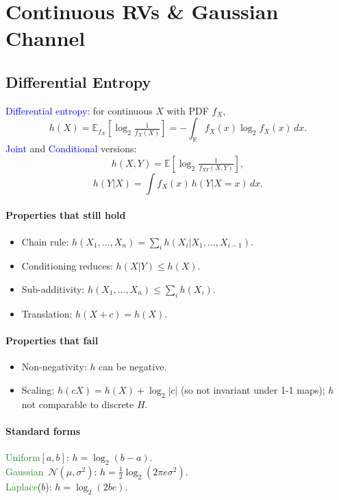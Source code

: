 \section{Continuous RVs \& Gaussian Channel}
\subsection{Differential Entropy}
\textcolor{Blue}{Differential entropy}: for continuous $X$ with PDF $f_X$,
\[h(X)=\mathbb E_{f_X}\!\left[\log_2\tfrac{1}{f_X(X)}\right]=-\!\!\int_{\mathbb R}\!f_X(x)\log_2 f_X(x)\,dx.\]
\textcolor{Blue}{Joint} and \textcolor{Blue}{Conditional} versions:
\[h(X,Y)=\mathbb E\!\left[\log_2\tfrac{1}{f_{XY}(X,Y)}\right],\]
\[h(Y|X)=\int\!f_X(x)\,h(Y|X\!=\!x)\,dx.\]
\paragraph{Properties that still hold}
\begin{itemize}
  \item \textcolor{Bittersweet}{Chain rule}: $h(X_1,\dots,X_n)=\sum_i h(X_i|X_1,\dots,X_{i-1})$.
  \item \textcolor{Bittersweet}{Conditioning reduces}: $h(X|Y)\le h(X)$.
  \item \textcolor{Bittersweet}{Sub-additivity}: $h(X_1,\dots,X_n)\le\sum_i h(X_i)$.
  \item \textcolor{Bittersweet}{Translation}: $h(X+c)=h(X)$.
\end{itemize}
\paragraph{Properties that fail}
\begin{itemize}
  \item \textcolor{Bittersweet}{Non-negativity}: $h$ can be negative.
  \item \textcolor{Bittersweet}{Scaling}: $h(cX)=h(X)+\log_2|c|$ (so not invariant under 1-1 maps); $h$ not comparable to discrete $H$.
\end{itemize}
\paragraph{Standard forms}
\textcolor{ForestGreen}{Uniform}$[a,b]$: $h=\log_2(b-a)$.\\
\textcolor{ForestGreen}{Gaussian}\ $\mathcal N(\mu,\sigma^2)$: $h=\tfrac12\log_2(2\pi e\sigma^2)$.\\
\textcolor{ForestGreen}{Laplace}($b$): $h=\log_2(2be)$.

